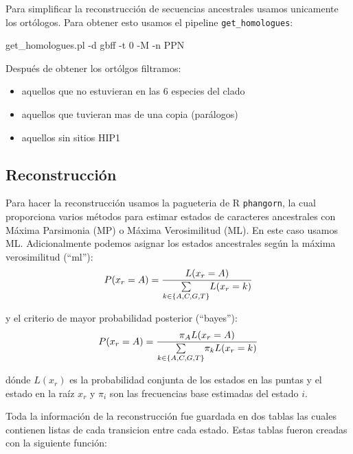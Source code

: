 \documentclass[
]{book}
\newenvironment{Shaded}{\begin{snugshade}}{\end{snugshade}}
\newcommand{\AttributeTok}[1]{\textcolor[rgb]{0.13,0.29,0.53}{#1}}
\newcommand{\ExtensionTok}[1]{#1}
\newcommand{\NormalTok}[1]{#1}
\providecommand{\tightlist}{%
  \setlength{\itemsep}{0pt}\setlength{\parskip}{0pt}}
\begin{document}
Para simplificar la reconstrucción de secuencias ancestrales usamos unicamente los ortólogos. Para obtener esto usamos el pipeline \texttt{get\_homologues}:

\begin{Shaded}
\begin{Highlighting}[]
\ExtensionTok{get\_homologues.pl} \AttributeTok{{-}d}\NormalTok{ gbff }\AttributeTok{{-}t}\NormalTok{ 0 }\AttributeTok{{-}M} \AttributeTok{{-}n}\NormalTok{ PPN}
\end{Highlighting}
\end{Shaded}

Después de obtener los ortólgos filtramos:

\begin{itemize}
\tightlist
\item
  aquellos que no estuvieran en las 6 especies del clado
\item
  aquellos que tuvieran mas de una copia (parálogos)
\item
  aquellos sin sitios HIP1
\end{itemize}

\hypertarget{reconstrucciuxf3n}{%
\subsection{Reconstrucción}\label{reconstrucciuxf3n}}

Para hacer la reconstrucción usamos la pagueteria de R \texttt{phangorn}, la cual proporciona varios métodos para estimar estados de caracteres ancestrales con Máxima Parsimonia (MP) o Máxima Verosimilitud (ML). En este caso usamos ML. Adicionalmente podemos asignar los estados ancestrales según la máxima verosimilitud (``ml''):
\[P(x_r=A) = {{L(x_r=A)} \over {\sum\limits_{k\in \{A,C,G,T\}}} L(x_r= k) }\]

y el criterio de mayor probabilidad posterior (``bayes''):
\[P(x_r=A) = {{\pi_A L(x_r=A)} \over {\sum\limits_{k\in \{A,C,G,T\}}} \pi_k L(x_r= k) }\]

dónde \(L(x_r)\) es la probabilidad conjunta de los estados en las puntas y el estado en la raíz \(x_r\) y \(\pi_i\) son las frecuencias base estimadas del estado \(i\).

Toda la información de la reconstrucción fue guardada en dos tablas las cuales contienen listas de cada transicion entre cada estado. Estas tablas fueron creadas con la siguiente función:
\end{document}
